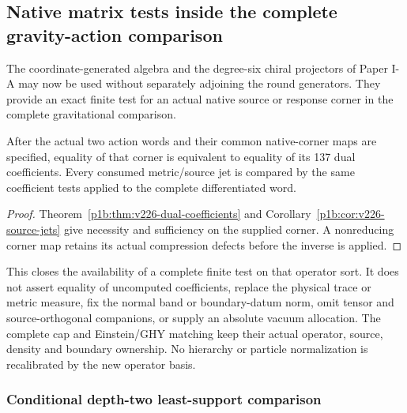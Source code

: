 \documentclass[11pt,a4paper]{article}
\begin{document}
\begingroup
\small
\RaggedRight
\setlength{\emergencystretch}{3em}

\endgroup

\subsection{Native matrix tests inside the complete gravity-action comparison}
\label{p3e:sec:v226-gravity-comparison}
The coordinate-generated algebra and the degree-six chiral projectors of
Paper I-A may now be used without separately adjoining the round generators.
They provide an exact finite test for an actual native source or response
corner in the complete gravitational comparison.

\begin{corollary}
\label{p3e:cor:v226-native-action-certificate}
After the actual two action words and their common native-corner maps are
specified, equality of that corner is equivalent to equality of its 137
dual coefficients. Every consumed metric/source jet is compared by the
same coefficient tests applied to the complete differentiated word.
\end{corollary}
\begin{proof}
Theorem~\ref{p1b:thm:v226-dual-coefficients} and
Corollary~\ref{p1b:cor:v226-source-jets} give necessity and sufficiency
on the supplied corner. A nonreducing corner map retains its actual
compression defects before the inverse is applied.
\end{proof}
This closes the availability of a complete finite test on that operator sort.
It does not assert equality of uncomputed coefficients, replace the physical
trace or metric measure, fix the normal band or boundary-datum norm, omit
tensor and source-orthogonal companions, or supply an absolute vacuum
allocation. The complete cap and Einstein/GHY matching keep their actual
operator, source, density and boundary ownership. No hierarchy or particle
normalization is recalibrated by the new operator basis.



\subsubsection{Conditional depth-two least-support comparison}
\label{p3e:subsec:complementary-laurent-action}
\end{document}
